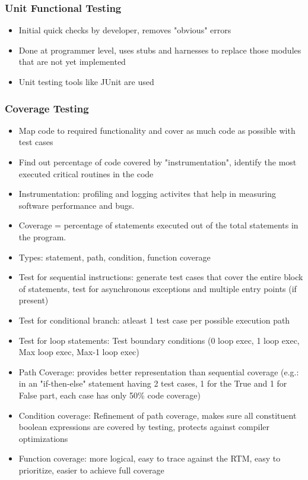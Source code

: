 \documentclass{article}
\begin{document}
\subsubsection{Unit Functional Testing}
\begin{itemize}
    \item Initial quick checks by developer, removes "obvious" errors
    
    \item Done at programmer level, uses stubs and harnesses to replace those modules that are not yet implemented
    
    \item Unit testing tools like JUnit are used
\end{itemize}
\subsubsection{Coverage Testing}
\begin{itemize}
    \item Map code to required functionality and cover as much code as possible with test cases
    
    \item Find out percentage of code covered by "instrumentation", identify the most executed critical routines in the code
    
    \item Instrumentation: profiling and logging activites that help in measuring software performance and bugs.
    
    \item Coverage = percentage of statements executed out of the total statements in the program.
    
    \item Types: statement, path, condition, function coverage
    
    \item Test for sequential instructions: generate test cases that cover the entire block of statements, test for asynchronous exceptions and multiple entry points (if present)
    
    \item Test for conditional branch: atleast 1 test case per possible execution path
    
    \item Test for loop statements: Test boundary conditions (0 loop exec, 1 loop exec, Max loop exec, Max-1 loop exec)
    
    \item Path Coverage: provides better representation than sequential coverage (e.g.: in an "if-then-else" statement having 2 test cases, 1 for the True and 1 for False part, each case has only 50\% code coverage)
    
    \item Condition coverage: Refinement of path coverage, makes sure all constituent boolean expressions are covered by testing, protects against compiler optimizations
    
    \item Function coverage: more logical, easy to trace against the RTM, easy to prioritize, easier to achieve full coverage
\end{itemize}
\end{document}
